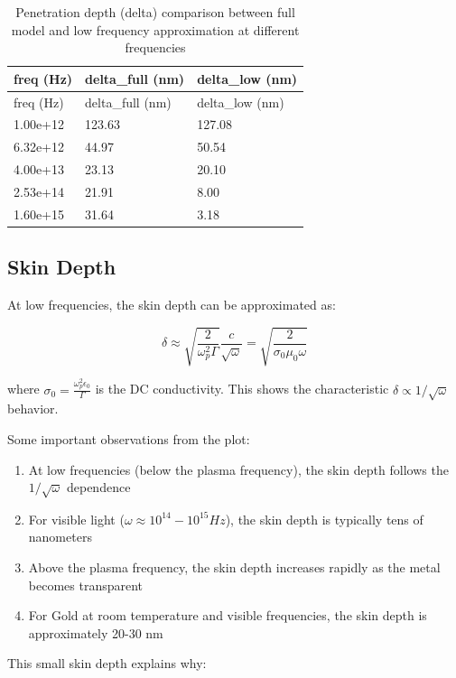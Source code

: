 \documentclass[
  a4paper,
]{book}
\providecommand{\tightlist}{%
  \setlength{\itemsep}{0pt}\setlength{\parskip}{0pt}}
\begin{document}
\begin{longtable}[]{@{}lll@{}}
\caption{Penetration depth (delta) comparison between full model and low
frequency approximation at different
frequencies}\label{tbl-penetration}\tabularnewline
\toprule\noalign{}
freq (Hz) & delta\_full (nm) & delta\_low (nm) \\
\midrule\noalign{}
\endfirsthead
\toprule\noalign{}
freq (Hz) & delta\_full (nm) & delta\_low (nm) \\
\midrule\noalign{}
\endhead
\bottomrule\noalign{}
\endlastfoot
1.00e+12 & 123.63 & 127.08 \\
6.32e+12 & 44.97 & 50.54 \\
4.00e+13 & 23.13 & 20.10 \\
2.53e+14 & 21.91 & 8.00 \\
1.60e+15 & 31.64 & 3.18 \\
\end{longtable}

\subsection{Skin Depth}\label{skin-depth}

At low frequencies, the skin depth can be approximated as:

\[
\delta \approx \sqrt{\frac{2}{\omega_p^2\Gamma}}\frac{c}{\sqrt{\omega}} = \sqrt{\frac{2}{\sigma_0\mu_0\omega}}
\]

where \(\sigma_0 = \frac{\omega_p^2\epsilon_0}{\Gamma}\) is the DC
conductivity. This shows the characteristic
\(\delta \propto 1/\sqrt{\omega}\) behavior.

Some important observations from the plot:

\begin{enumerate}
\def\labelenumi{\arabic{enumi}.}
\tightlist
\item
  At low frequencies (below the plasma frequency), the skin depth
  follows the \(1/\sqrt{\omega}\) dependence
\item
  For visible light (\(\omega \approx 10^{14}-10^{15} Hz\)), the skin
  depth is typically tens of nanometers
\item
  Above the plasma frequency, the skin depth increases rapidly as the
  metal becomes transparent
\item
  For Gold at room temperature and visible frequencies, the skin depth
  is approximately 20-30 nm
\end{enumerate}

This small skin depth explains why:
\end{document}
